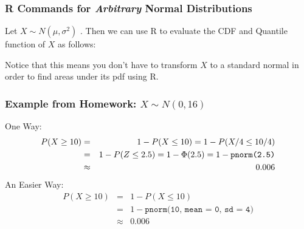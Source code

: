 \documentclass[handout]{beamer}
\begin{document}

\begin{frame}
\frametitle{R Commands for \emph{Arbitrary} Normal Distributions}
Let $X \sim N(\mu, \sigma^2)$ . Then we can use R to evaluate the CDF and Quantile function of $X$ as follows:
\vspace{1em}
\begin{table}
\centering
{}
\end{table}
\vspace{1em}
\alert{Notice that this means you don't have to transform $X$ to a standard normal in order to find areas under its pdf using R.}
\end{frame}
\begin{frame}
\frametitle{Example from Homework: $X \sim N(0,16)$}

One Way:
			\begin{eqnarray*}
				P(X \geq 10) &=&  1 - P(X \leq 10) = 1 - P(X /4\leq 10/4)\\
				&=& 1 - P(Z\leq 2.5) =   1 - \Phi(2.5) =  1 - \mbox{\texttt{pnorm(2.5)}}\\ 
				&\approx& 0.006
			\end{eqnarray*}
\pause
An Easier Way:
	\begin{eqnarray*}
	P(X \geq 10) &=& 1 - P(X \leq 10)\\ 
	&=&  1 - \texttt{pnorm(10, mean = 0, sd = 4)} \\ 
	&\approx& 0.006
	\end{eqnarray*}
\end{frame}
\end{document}
